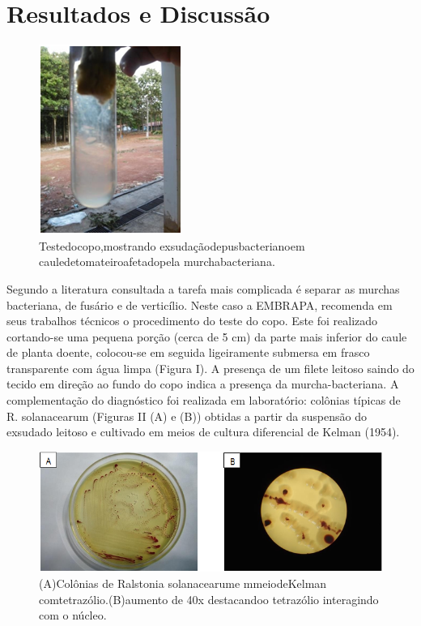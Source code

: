 \documentclass[article,12pt,onesidea,4paper,english,brazil]{abntex2}
\begin{document}
	\section*{Resultados e Discussão}

	\begin{figure}[!htb]
		\centering
		\includegraphics[width=0.3\linewidth]{pip06.png}
		\caption{Testedocopo,mostrando exsudaçãodepusbacterianoem cauledetomateiroafetadopela murchabacteriana.}
		\label{fig:Rotulo}
	\end{figure}

Segundo a literatura consultada a tarefa mais complicada é separar as murchas bacteriana, de fusário e de verticílio. Neste caso a EMBRAPA, recomenda em seus trabalhos técnicos o procedimento do teste do copo. Este foi realizado cortando-se uma pequena porção (cerca de 5 cm) da parte mais inferior do caule de planta doente, colocou-se em seguida ligeiramente submersa em frasco transparente com água limpa (Figura I). A presença de um filete leitoso saindo do tecido em direção ao fundo do copo indica	a	presença		da	murcha-bacteriana.		A complementação	do	diagnóstico	foi	realizada	em laboratório: colônias típicas de R. solanacearum (Figuras II (A) e (B)) obtidas a partir da suspensão do exsudado leitoso e cultivado em meios de cultura diferencial de Kelman (1954).

\begin{figure}[h]
	\centering
	\includegraphics[width=0.7\linewidth]{pipi.png}
	\caption{(A)Colônias de Ralstonia solanacearume mmeiodeKelman comtetrazólio.(B)aumento de 40x destacandoo tetrazólio interagindo com o núcleo.}
\end{figure}
\end{document}

